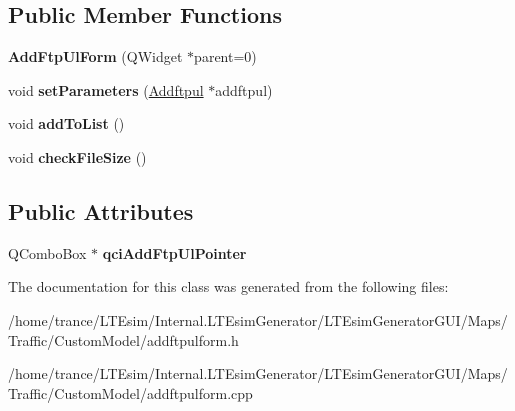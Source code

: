 \subsection*{Public Member Functions}
\begin{DoxyCompactItemize}
\item 
{\bfseries Add\+Ftp\+Ul\+Form} (Q\+Widget $\ast$parent=0)\hypertarget{class_add_ftp_ul_form_a295bac01a0185361a45a47810dec71a0}{}\label{class_add_ftp_ul_form_a295bac01a0185361a45a47810dec71a0}

\item 
void {\bfseries set\+Parameters} (\hyperlink{class_addftpul}{Addftpul} $\ast$addftpul)\hypertarget{class_add_ftp_ul_form_a59c49d838a8eb78757d444771b0a01f7}{}\label{class_add_ftp_ul_form_a59c49d838a8eb78757d444771b0a01f7}

\item 
void {\bfseries add\+To\+List} ()\hypertarget{class_add_ftp_ul_form_a8a4180aa460ddb2f0130e84f7d3889af}{}\label{class_add_ftp_ul_form_a8a4180aa460ddb2f0130e84f7d3889af}

\item 
void {\bfseries check\+File\+Size} ()\hypertarget{class_add_ftp_ul_form_a110c9a0306bde37ab964d8e2e90a42db}{}\label{class_add_ftp_ul_form_a110c9a0306bde37ab964d8e2e90a42db}

\end{DoxyCompactItemize}
\subsection*{Public Attributes}
\begin{DoxyCompactItemize}
\item 
Q\+Combo\+Box $\ast$ {\bfseries qci\+Add\+Ftp\+Ul\+Pointer}\hypertarget{class_add_ftp_ul_form_a972631cb3318fb58f483d8f79e32047d}{}\label{class_add_ftp_ul_form_a972631cb3318fb58f483d8f79e32047d}

\end{DoxyCompactItemize}


The documentation for this class was generated from the following files\+:\begin{DoxyCompactItemize}
\item 
/home/trance/\+L\+T\+Esim/\+Internal.\+L\+T\+Esim\+Generator/\+L\+T\+Esim\+Generator\+G\+U\+I/\+Maps/\+Traffic/\+Custom\+Model/addftpulform.\+h\item 
/home/trance/\+L\+T\+Esim/\+Internal.\+L\+T\+Esim\+Generator/\+L\+T\+Esim\+Generator\+G\+U\+I/\+Maps/\+Traffic/\+Custom\+Model/addftpulform.\+cpp\end{DoxyCompactItemize}

